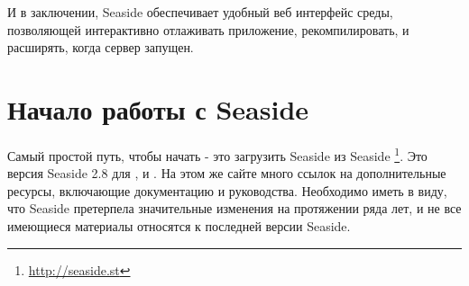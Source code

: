 \documentclass[a4paper,10pt,twoside]{book}
\begin{document}

И в заключении, Seaside обеспечивает удобный веб интерфейс среды,
позволяющей интерактивно отлаживать приложение, рекомпилировать, и расширять, когда сервер запущен.


\section{Начало работы с Seaside}


Самый простой путь, чтобы начать - это загрузить Seaside
 из Seaside  \footnote{\url{http://seaside.st}}.
Это версия Seaside 2.8 для ,  и .
На этом же сайте много ссылок на дополнительные ресурсы, включающие документацию и руководства.
Необходимо иметь в виду, что Seaside претерпела значительные изменения на протяжении ряда лет,
и не все имеющиеся материалы относятся к последней версии Seaside.

\end{document}
